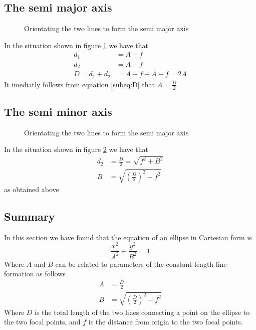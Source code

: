 \documentclass[a5paper,12pt]{article}
\begin{document}
\subsection{The semi major axis}
\begin{figure}[h]
  \centering
 
\caption{Orientating the two lines to form the semi major axis} \label{fig:semiMajor}
\end{figure}

In the situation shown in figure \ref{fig:semiMajor} we have that
\begin{subequations}
\begin{align}
d_1&=A+f\\
d_2&=A-f\\
D=d_1+d_2&=A+f+A-f=2A \label{subeq:D}
\end{align}
\end{subequations}
It imediatly follows from equation \ref{subeq:D} that $A=\frac{D}{2}$

\subsection{The semi minor axis}
\begin{figure}[h]
  \centering
 
\caption{Orientating the two lines to form the semi major axis} \label{fig:semiMinor}
\end{figure}

In the situation shown in figure \ref{fig:semiMinor} we have that
\begin{subequations}
\begin{align}
d_2&=\frac{D}{2}=\sqrt{f^2+B^2}\\
B&=\sqrt{\left(\frac{D}{2}\right)^2-f^2}\label{eq:B}
\end{align}
\end{subequations}
as obtained above
\begin{framed}
\subsection{Summary}
In this section we have found that the equation of an ellipse in Cartesian form is
\begin{equation*}
\frac{x^2}{A^2}+\frac{y^2}{B^2}=1
\end{equation*}
Where $A$ and $B$ can be related to parameters of the constant length line formation as follows
\begin{subequations}
\begin{align*}
A&=\frac{D}{2}\\
B&=\sqrt{\left(\frac{D}{2}\right)^2-f^2}
\end{align*}
\end{subequations}
Where $D$ is the total length of the two lines connecting a point on the ellipse to the two focal points, and $f$ is the distance from origin to the two focal points.
\end{framed}
\end{document}
